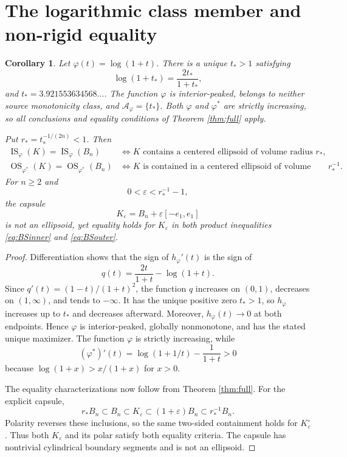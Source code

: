 \documentclass[11pt]{article}
\newtheorem{corollary}[theorem]{Corollary}
\newcommand{\IS}{\operatorname{IS}}
\newcommand{\OS}{\operatorname{OS}}
\begin{document}
\section{The logarithmic class member and non-rigid equality}

\begin{corollary}\label{cor:log}
Let $\varphi(t)=\log(1+t)$.  There is a unique $t_*>1$ satisfying
\begin{equation}\label{eq:tstar}
 \log(1+t_*)=\frac{2t_*}{1+t_*},
\end{equation}
and $t_*=3.921553634568\ldots$.  The function $\varphi$ is
interior-peaked, belongs to neither source monotonicity class, and
$\mathcal A_\varphi=\{t_*\}$.  Both $\varphi$ and $\varphi^*$ are strictly
increasing, so all conclusions and equality conditions of Theorem
\ref{thm:full} apply.

Put $r_*=t_*^{-1/(2n)}<1$.  Then
\begin{align*}
 \IS_\varphi(K)=\IS_\varphi(B_n)
 &\Longleftrightarrow K\text{ contains a centered ellipsoid of volume radius }r_*,\\
 \OS_{\varphi^*}(K)=\OS_{\varphi^*}(B_n)
 &\Longleftrightarrow K\text{ is contained in a centered ellipsoid of volume radius }r_*^{-1}.
\end{align*}
For $n\geq2$ and
\begin{equation}\label{eq:epsilon}
 0<\varepsilon<r_*^{-1}-1,
\end{equation}
the capsule
\[
 K_\varepsilon=B_n+\varepsilon[-e_1,e_1]
\]
is not an ellipsoid, yet equality holds for $K_\varepsilon$ in both product
inequalities \eqref{eq:BSinner} and \eqref{eq:BSouter}.
\end{corollary}

\begin{proof}
Differentiation shows that the sign of
$h_\varphi'(t)$ is the sign of
\[
 q(t)=\frac{2t}{1+t}-\log(1+t).
\]
Since $q'(t)=(1-t)/(1+t)^2$, the function $q$ increases on $(0,1)$,
decreases on $(1,\infty)$, and tends to $-\infty$.  It has the unique
positive zero $t_*>1$, so $h_\varphi$ increases up to $t_*$ and decreases
afterward.  Moreover, $h_\varphi(t)\to0$ at both endpoints.  Hence
$\varphi$ is interior-peaked, globally nonmonotone, and has the stated unique
maximizer.  The function $\varphi$ is strictly increasing, while
\[
 (\varphi^*)'(t)=\log(1+1/t)-\frac1{1+t}>0
\]
because $\log(1+x)>x/(1+x)$ for $x>0$.

The equality characterizations now follow from Theorem \ref{thm:full}.  For
the explicit capsule,
\[
 r_*B_n\subset B_n\subset K_\varepsilon
 \subset(1+\varepsilon)B_n\subset r_*^{-1}B_n.
\]
Polarity reverses these inclusions, so the same two-sided containment holds
for $K_\varepsilon^\circ$.  Thus both $K_\varepsilon$ and its polar satisfy
both equality criteria.  The capsule has nontrivial cylindrical boundary
segments and is not an ellipsoid.
\end{proof}
\end{document}
